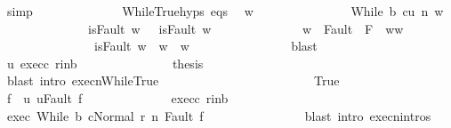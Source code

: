 \begin{isabellebody}
\ simp\isanewline
\ \ \ \ \ \ \ \ \ \ \ \ \isamarkupfalse%
\ WhileTrue{\isachardot}hyps\ eqs\ \isamarkupfalse%
\ w{\isacharprime}\ \isanewline
\ \ \ \ \ \ \ \ \ \ \ \ \ \ {\isachardoublequoteopen}{\isasymGamma}{\isasymturnstile}{\isasymlangle}While\ b\ c{\isacharcomma}u{\isasymrangle}\ {\isacharequal}n{\isasymRightarrow}\ w{\isacharprime}{\isachardoublequoteclose}\isanewline
\ \ \ \ \ \ \ \ \ \ \ \ \ \ {\isachardoublequoteopen}isFault\ w\ \ {\isasymlongrightarrow}\ isFault\ w{\isacharprime}{\isachardoublequoteclose}\isanewline
\ \ \ \ \ \ \ \ \ \ \ \ \ \ {\isachardoublequoteopen}w{\isacharprime}\ {\isasymin}\ Fault\ {\isacharbackquote}\ {\isacharparenleft}{\isacharminus}F{\isacharparenright}\ {\isasymlongrightarrow}\ w{\isacharprime}{\isacharequal}w{\isachardoublequoteclose}\ \isanewline
\ \ \ \ \ \ \ \ \ \ \ \ \ \ {\isachardoublequoteopen}{\isasymnot}\ isFault\ w{\isacharprime}\ {\isasymlongrightarrow}\ w{\isacharprime}\ {\isacharequal}\ w{\isachardoublequoteclose}\isanewline
\ \ \ \ \ \ \ \ \ \ \ \ \ \ \isamarkupfalse%
\ blast\isanewline
\ \ \ \ \ \ \ \ \ \ \ \ \isamarkupfalse%
\ u{\isacharprime}\ exec{\isacharunderscore}c\ r{\isacharunderscore}in{\isacharunderscore}b\ \isanewline
\ \ \ \ \ \ \ \ \ \ \ \ \isamarkupfalse%
\ {\isacharquery}thesis\isanewline
\ \ \ \ \ \ \ \ \ \ \ \ \ \ \isamarkupfalse%
\ {\isacharparenleft}blast\ intro{\isacharcolon}\ execn{\isachardot}WhileTrue{\isacharparenright}\isanewline
\ \ \ \ \ \ \ \ \ \ \isamarkupfalse%
\isanewline
\ \ \ \ \ \ \ \ \ \ \ \ \isamarkupfalse%
\ True\isanewline
\ \ \ \ \ \ \ \ \ \ \ \ \isamarkupfalse%
\ \isamarkupfalse%
\ f{\isacharprime}\ \ u{\isacharprime}{\isacharcolon}\ {\isachardoublequoteopen}u{\isacharprime}{\isacharequal}Fault\ f{\isacharprime}{\isachardoublequoteclose}\isacommand{{\isachardot}{\isachardot}}\isamarkupfalse%
\isanewline
\ \ \ \ \ \ \ \ \ \ \ \ \isamarkupfalse%
\ exec{\isacharunderscore}c\ r{\isacharunderscore}in{\isacharunderscore}b\ \isanewline
\ \ \ \ \ \ \ \ \ \ \ \ \isamarkupfalse%
\ exec{\isacharcolon}\ {\isachardoublequoteopen}{\isasymGamma}{\isasymturnstile}{\isasymlangle}While\ b\ c{\isacharcomma}Normal\ r{\isasymrangle}\ {\isacharequal}n{\isasymRightarrow}\ Fault\ f{\isacharprime}{\isachardoublequoteclose}\isanewline
\ \ \ \ \ \ \ \ \ \ \ \ \ \ \isamarkupfalse%
\ {\isacharparenleft}blast\ intro{\isacharcolon}\ execn{\isachardot}intros{\isacharparenright}\isanewline

\end{isabellebody}

